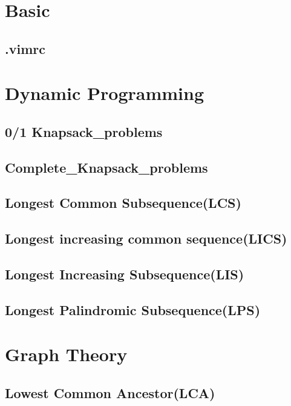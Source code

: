 \section{Basic}
    \subsection{.vimrc}
        

\section{Dynamic Programming}
    \subsection{0/1 Knapsack\_problems}
        
    \subsection{Complete\_Knapsack\_problems}
        
    \subsection{Longest Common Subsequence(LCS)}
        
    \subsection{Longest increasing common sequence(LICS)}
        
    \subsection{Longest Increasing Subsequence(LIS)}
        
    \subsection{Longest Palindromic Subsequence(LPS)}
        
\section{Graph Theory}
    \subsection{Lowest Common Ancestor(LCA)}
        
